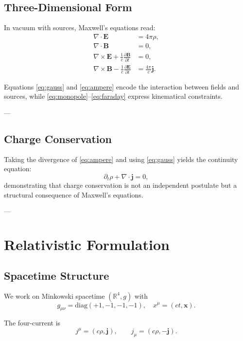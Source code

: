 \documentclass[12pt]{article}
\begin{document}
\subsection{Three-Dimensional Form}

In vacuum with sources, Maxwell’s equations read:
\begin{align}
\nabla \cdot \mathbf{E} &= 4\pi \rho, \label{eq:gauss} \\
\nabla \cdot \mathbf{B} &= 0, \label{eq:monopole} \\
\nabla \times \mathbf{E} + \frac{1}{c}\frac{\partial \mathbf{B}}{\partial t} &= 0, \label{eq:faraday} \\
\nabla \times \mathbf{B} - \frac{1}{c}\frac{\partial \mathbf{E}}{\partial t} &= \frac{4\pi}{c}\mathbf{j}. \label{eq:ampere}
\end{align}

Equations \eqref{eq:gauss} and \eqref{eq:ampere} encode the interaction between fields and sources, while \eqref{eq:monopole}–\eqref{eq:faraday} express kinematical constraints.

---

\subsection{Charge Conservation}

Taking the divergence of \eqref{eq:ampere} and using \eqref{eq:gauss} yields the continuity equation:
\begin{equation}
\partial_t \rho + \nabla \cdot \mathbf{j} = 0,
\end{equation}
demonstrating that charge conservation is not an independent postulate but a structural consequence of Maxwell’s equations.

---

\section{Relativistic Formulation}

\subsection{Spacetime Structure}

We work on Minkowski spacetime $(\mathbb{R}^4, g)$ with
\[
g_{\mu\nu} = \mathrm{diag}(+1,-1,-1,-1),
\quad
x^\mu = (ct, \mathbf{x}).
\]

The four-current is
\[
j^\mu = (c\rho, \mathbf{j}), \qquad j_\mu = (c\rho, -\mathbf{j}).
\]
\end{document}
